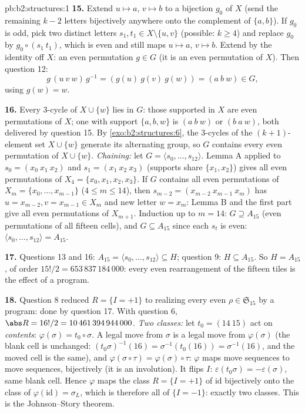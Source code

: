 \begin{solution}{pb:b2:structures:1}
\textbf{15.} Extend $u \mapsto a$, $v \mapsto b$ to a bijection
$g_0$ of $X$ (send the remaining $k - 2$ letters bijectively
anywhere onto the complement of $\{a, b\}$). If $g_0$ is odd,
pick two distinct letters $s_1, t_1 \in X \setminus \{u, v\}$
(possible: $k \geq 4$) and replace $g_0$ by $g_0 \circ (s_1\
t_1)$, which is even and still maps $u \mapsto a$, $v \mapsto
b$. Extend by the identity off $X$: an even permutation $g \in
G$ (it is an even permutation of $X$). Then question 12:
\[
g\,(u\ v\ w)\,g^{-1} = (g(u)\ g(v)\ g(w)) = (a\ b\ w) \in G,
\]
using $g(w) = w$.

\textbf{16.} Every $3$-cycle of $X \cup \{w\}$ lies in $G$:
those supported in $X$ are even permutations of $X$; one with
support $\{a, b, w\}$ is $(a\ b\ w)$ or $(b\ a\ w)$, both
delivered by question 15. By \cref{exo:b2:structures:6}, the
$3$-cycles of the $(k+1)$-element set $X \cup \{w\}$ generate
its alternating group, so $G$ contains every even permutation of
$X \cup \{w\}$. \emph{Chaining:} let $G = \langle s_0, \dots,
s_{12}\rangle$. Lemma A applied to $s_0 = (x_0\ x_1\ x_2)$ and
$s_1 = (x_1\ x_2\ x_3)$ (supports share $\{x_1, x_2\}$) gives
all even permutations of $X_4 = \{x_0, x_1, x_2, x_3\}$. If $G$
contains all even permutations of $X_m = \{x_0, \dots,
x_{m-1}\}$ ($4 \leq m \leq 14$), then $s_{m-2} = (x_{m-2}\
x_{m-1}\ x_m)$ has $u = x_{m-2}, v = x_{m-1} \in X_m$ and new
letter $w = x_m$: Lemma B and the first part give all even
permutations of $X_{m+1}$. Induction up to $m = 14$: $G \supseteq
A_{15}$ (even permutations of all fifteen cells), and $G
\subseteq A_{15}$ since each $s_t$ is even: $\langle s_0, \dots,
s_{12}\rangle = A_{15}$.

\textbf{17.} Questions 13 and 16: $A_{15} = \langle s_0, \dots,
s_{12}\rangle \subseteq H$; question 9: $H \subseteq A_{15}$. So
$H = A_{15}$, of order $15!/2 = 653\,837\,184\,000$: every even
rearrangement of the fifteen tiles is the effect of a program.

\textbf{18.} Question 8 reduced $R = \{I = +1\}$ to realizing
every even $\rho \in \mathfrak{S}_{15}$ by a program: done by
question 17. With question 6, $\abs R = 16!/2 =
10\,461\,394\,944\,000$. \emph{Two classes:} let $t_0 = (14\
15)$ act on \emph{contents}: $\varphi(\sigma) = t_0 \circ
\sigma$. A legal move from $\sigma$ is a legal move from
$\varphi(\sigma)$ (the blank cell is unchanged:
$(t_0\sigma)^{-1}(16) = \sigma^{-1}(t_0(16)) = \sigma^{-1}(16)$,
and the moved cell is the same), and $\varphi(\sigma \circ \tau)
= \varphi(\sigma) \circ \tau$: $\varphi$ maps move sequences to
move sequences, bijectively (it is an involution). It flips $I$:
$\varepsilon(t_0\sigma) = -\varepsilon(\sigma)$, same blank
cell. Hence $\varphi$ maps the class $R = \{I = +1\}$ of
$\mathrm{id}$ bijectively onto the class of $\varphi(\mathrm{id})
= \sigma_L$, which is therefore all of $\{I = -1\}$: exactly two
classes. This is the Johnson--Story theorem.


\end{solution}
